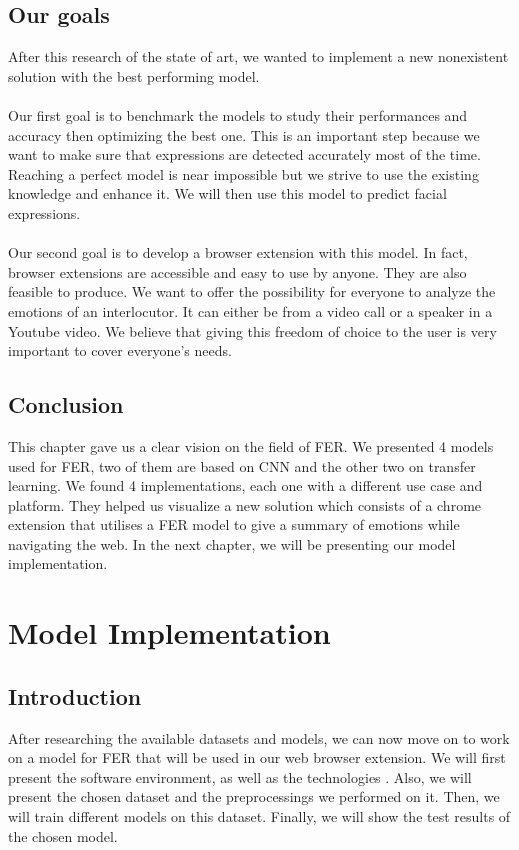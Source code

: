 \documentclass[12pt,a4paper,oneside,english]{book}
\begin{document}
\section{Our goals}
After this research of the state of art, we wanted to implement a new nonexistent solution with the best performing model.\\ \\
Our first goal is to benchmark the models to study their performances and accuracy then optimizing the best one. This is an important step because we want to make sure that expressions are detected accurately most of the time. Reaching a perfect model is near impossible but we strive to use the existing knowledge and enhance it. We will then use this model to predict facial expressions.\\ \\
Our second goal is to develop a browser extension with this model. In fact, browser extensions are accessible and easy to use by anyone. They are also feasible to produce. We want to offer the possibility for everyone to analyze the emotions of an interlocutor. It can either be from a video call or a speaker in a Youtube video. We believe that giving this freedom of choice to the user is very important to cover everyone's needs.
\section*{Conclusion}
This chapter gave us a clear vision on the field of FER. We presented 4 models used for FER, two of them are based on CNN and the other two on transfer learning. We found 4 implementations, each one with a different use case and platform. They helped us visualize a new solution which consists of a chrome extension that utilises a FER model to give a summary of emotions while navigating the web. In the next chapter, we will be presenting our model implementation.

\chapter{Model Implementation}
\label{ch:3eme}
\minitoc
\section*{Introduction}
After researching the available datasets and models, we can now move on to work on a model for FER that will be used in our web browser extension. We will first present the software environment, as well as the technologies . Also, we will present the chosen dataset and the preprocessings we performed on it. Then, we will train different models on this dataset. Finally, we will show the test results of the chosen model.
\end{document}
